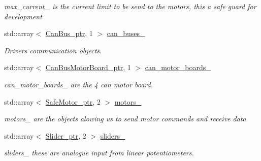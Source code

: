 \begin{DoxyCompactItemize}
\begin{DoxyCompactList}\small\item\em max\+\_\+current\+\_\+ is the current limit to be send to the motors, this a safe guard for development \end{DoxyCompactList}\item 
std\+::array$<$ \hyperlink{common__header_8hpp_a793c8789a7598e8aaf766939da7262af}{Can\+Bus\+\_\+ptr}, 1 $>$ \hyperlink{classblmc__robots_1_1SingleLeg_a021418412c79cfa868bfffec24155ef8}{can\+\_\+buses\+\_\+}
\begin{DoxyCompactList}\small\item\em Drivers communication objects. \end{DoxyCompactList}\item 
std\+::array$<$ \hyperlink{common__header_8hpp_aab1c6ddb1273247a1b45d5e8b417c216}{Can\+Bus\+Motor\+Board\+\_\+ptr}, 1 $>$ \hyperlink{classblmc__robots_1_1SingleLeg_a133902cdf8468f2cf8849fdc6daed312}{can\+\_\+motor\+\_\+boards\+\_\+}\hypertarget{classblmc__robots_1_1SingleLeg_a133902cdf8468f2cf8849fdc6daed312}{}\label{classblmc__robots_1_1SingleLeg_a133902cdf8468f2cf8849fdc6daed312}

\begin{DoxyCompactList}\small\item\em can\+\_\+motor\+\_\+boards\+\_\+ are the 4 can motor board. \end{DoxyCompactList}\item 
std\+::array$<$ \hyperlink{common__header_8hpp_a9850cf917156e20846aef3f8195aea0f}{Safe\+Motor\+\_\+ptr}, 2 $>$ \hyperlink{classblmc__robots_1_1SingleLeg_ac2964b955b883496833cd5d00ab2b1c7}{motors\+\_\+}\hypertarget{classblmc__robots_1_1SingleLeg_ac2964b955b883496833cd5d00ab2b1c7}{}\label{classblmc__robots_1_1SingleLeg_ac2964b955b883496833cd5d00ab2b1c7}

\begin{DoxyCompactList}\small\item\em motors\+\_\+ are the objects alowing us to send motor commands and receive data \end{DoxyCompactList}\item 
std\+::array$<$ \hyperlink{common__header_8hpp_a4cb9a95e8b2c0bf237ce29f5252c7b73}{Slider\+\_\+ptr}, 2 $>$ \hyperlink{classblmc__robots_1_1SingleLeg_a009823b7c3e817eabb6e572406460d2f}{sliders\+\_\+}\hypertarget{classblmc__robots_1_1SingleLeg_a009823b7c3e817eabb6e572406460d2f}{}\label{classblmc__robots_1_1SingleLeg_a009823b7c3e817eabb6e572406460d2f}

\begin{DoxyCompactList}\small\item\em sliders\+\_\+ these are analogue input from linear potentiometers. \end{DoxyCompactList}\end{DoxyCompactItemize}


